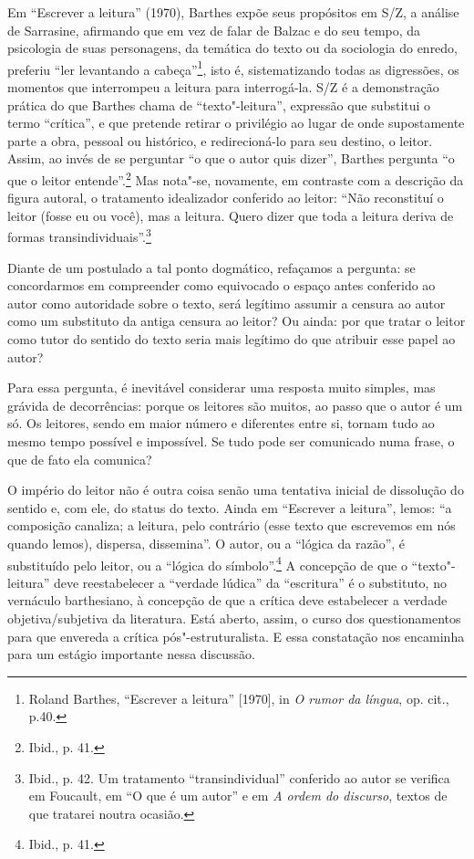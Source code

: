 Em ``Escrever a leitura'' (1970), Barthes expõe seus propósitos em S/Z,
a análise de Sarrasine, afirmando que em vez de falar de Balzac e do seu
tempo, da psicologia de suas personagens, da temática do texto ou da
sociologia do enredo, preferiu ``ler levantando a cabeça''\footnote{Roland
  Barthes, ``Escrever a leitura'' {[}1970{]}, in \emph{O rumor da
  língua}, op. cit., p.40.}, isto é, sistematizando todas as digressões,
os momentos que interrompeu a leitura para interrogá-la. S/Z é a
demonstração prática do que Barthes chama de ``texto"-leitura'',
expressão que substitui o termo ``crítica'', e que pretende retirar o
privilégio ao lugar de onde supostamente parte a obra, pessoal ou
histórico, e redirecioná-lo para seu destino, o leitor. Assim, ao invés
de se perguntar ``o que o autor quis dizer'', Barthes pergunta ``o que o
leitor entende''.\footnote{Ibid., p. 41.} Mas nota"-se, novamente, em
contraste com a descrição da figura autoral, o tratamento idealizador
conferido ao leitor: ``Não reconstituí o leitor (fosse eu ou você), mas
a leitura. Quero dizer que toda a leitura deriva de formas
transindividuais''.\footnote{Ibid., p. 42. Um tratamento
  ``transindividual'' conferido ao autor se verifica em Foucault, em ``O
  que é um autor'' e em \emph{A ordem do discurso}, textos de que
  tratarei noutra ocasião.}

Diante de um postulado a tal ponto dogmático, refaçamos a pergunta: se
concordarmos em compreender como equivocado o espaço antes conferido ao
autor como autoridade sobre o texto, será legítimo assumir a censura ao
autor como um substituto da antiga censura ao leitor? Ou ainda: por que
tratar o leitor como tutor do sentido do texto seria mais legítimo do
que atribuir esse papel ao autor?

Para essa pergunta, é inevitável considerar uma resposta muito simples,
mas grávida de decorrências: porque os leitores são muitos, ao passo que
o autor é um só. Os leitores, sendo em maior número e diferentes entre
si, tornam tudo ao mesmo tempo possível e impossível. Se tudo pode ser
comunicado numa frase, o que de fato ela comunica?

O império do leitor não é outra coisa senão uma tentativa inicial de
dissolução do sentido e, com ele, do status do texto. Ainda em
``Escrever a leitura'', lemos: ``a composição canaliza; a leitura, pelo
contrário (esse texto que escrevemos em nós quando lemos), dispersa,
dissemina''. O autor, ou a ``lógica da razão'', é substituído pelo
leitor, ou a ``lógica do símbolo''.\footnote{Ibid., p. 41.} A concepção
de que o ``texto"-leitura'' deve reestabelecer a ``verdade lúdica'' da
``escritura'' é o substituto, no vernáculo barthesiano, à concepção de
que a crítica deve estabelecer a verdade objetiva/subjetiva da
literatura. Está aberto, assim, o curso dos questionamentos para que
envereda a crítica pós"-estruturalista. E essa constatação nos encaminha
para um estágio importante nessa discussão.

